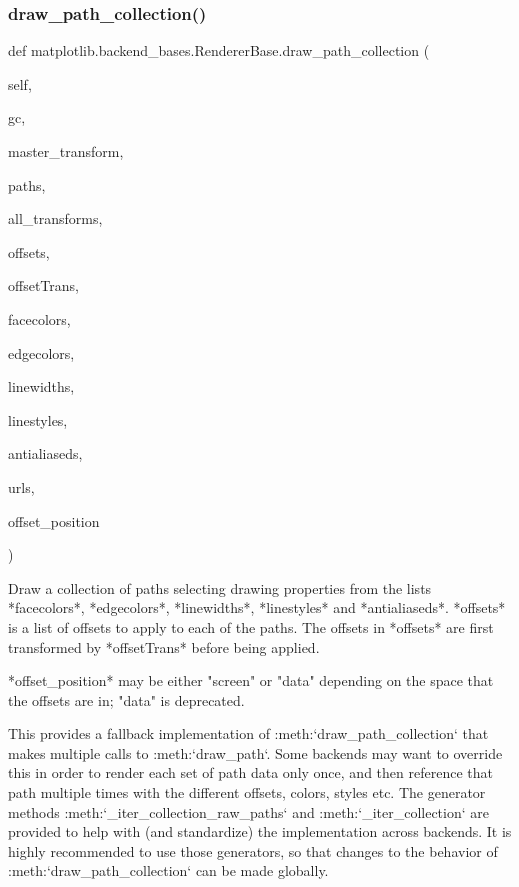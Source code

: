 \subsubsection{\texorpdfstring{draw\+\_\+path\+\_\+collection()}{draw\_path\_collection()}}
{\footnotesize\ttfamily def matplotlib.\+backend\+\_\+bases.\+Renderer\+Base.\+draw\+\_\+path\+\_\+collection (\begin{DoxyParamCaption}\item[{}]{self,  }\item[{}]{gc,  }\item[{}]{master\+\_\+transform,  }\item[{}]{paths,  }\item[{}]{all\+\_\+transforms,  }\item[{}]{offsets,  }\item[{}]{offset\+Trans,  }\item[{}]{facecolors,  }\item[{}]{edgecolors,  }\item[{}]{linewidths,  }\item[{}]{linestyles,  }\item[{}]{antialiaseds,  }\item[{}]{urls,  }\item[{}]{offset\+\_\+position }\end{DoxyParamCaption})}

\begin{DoxyVerb}Draw a collection of paths selecting drawing properties from
the lists *facecolors*, *edgecolors*, *linewidths*,
*linestyles* and *antialiaseds*. *offsets* is a list of
offsets to apply to each of the paths.  The offsets in
*offsets* are first transformed by *offsetTrans* before being
applied.

*offset_position* may be either "screen" or "data" depending on the
space that the offsets are in; "data" is deprecated.

This provides a fallback implementation of
:meth:`draw_path_collection` that makes multiple calls to
:meth:`draw_path`.  Some backends may want to override this in
order to render each set of path data only once, and then
reference that path multiple times with the different offsets,
colors, styles etc.  The generator methods
:meth:`_iter_collection_raw_paths` and
:meth:`_iter_collection` are provided to help with (and
standardize) the implementation across backends.  It is highly
recommended to use those generators, so that changes to the
behavior of :meth:`draw_path_collection` can be made globally.
\end{DoxyVerb}
 \mbox{\label{classmatplotlib_1_1backend__bases_1_1RendererBase_af2f9c679814f3bdd072844d412142345}} 
